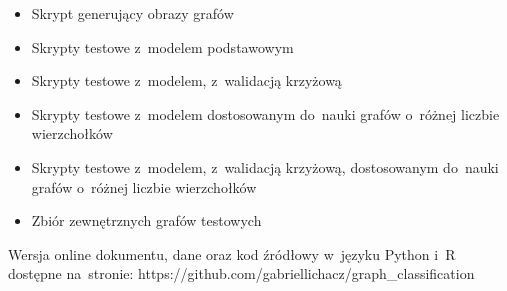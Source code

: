 
\begin{itemize}[label=-,labelsep=0.4cm,leftmargin=0.6cm]
    \item Skrypt generujący obrazy grafów
    \item Skrypty testowe z~modelem podstawowym
    \item Skrypty testowe z~modelem, z~walidacją krzyżową
    \item Skrypty testowe z~modelem dostosowanym do~nauki grafów o~różnej liczbie wierzchołków
    \item Skrypty testowe z~modelem, z~walidacją krzyżową, dostosowanym do~nauki grafów o~różnej liczbie wierzchołków
    \item Zbiór zewnętrznych grafów testowych
\end{itemize}

\vspace*{\fill}

Wersja online dokumentu, dane oraz kod źródłowy w~języku Python i~R dostępne na~stronie:
https://github.com/gabriellichacz/graph\_classification